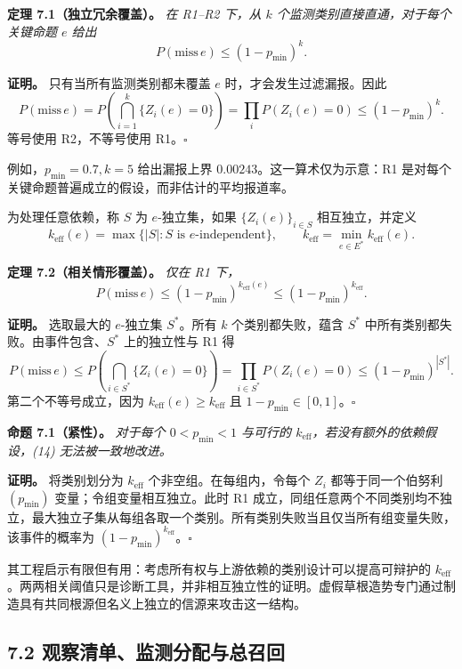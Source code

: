 \documentclass[
  chinese,
  11pt]{article}
\begin{document}
\textbf{定理 7.1（独立冗余覆盖）。} \emph{在 R1--R2 下，从 \(k\) 个监测类别直接直通，对于每个关键命题 \(e\) 给出} \[
P(\mathrm{miss}\,e)\leq(1-p_{\min})^k.
\tag{13}
\]

\textbf{证明。} 只有当所有监测类别都未覆盖 \(e\) 时，才会发生过滤漏报。因此 \[
P(\mathrm{miss}\,e)=P\!\left(\bigcap_{i=1}^k\{Z_i(e)=0\}\right)
=\prod_iP(Z_i(e)=0)\leq(1-p_{\min})^k.
\] 等号使用 R2，不等号使用 R1。\(\square\)

例如，\(p_{\min}=0.7,k=5\) 给出漏报上界 \(0.00243\)。这一算术仅为示意：R1 是对每个关键命题普遍成立的假设，而非估计的平均报道率。

为处理任意依赖，称 \(S\) 为 \(e\)-独立集，如果 \(\{Z_i(e)\}_{i\in S}\) 相互独立，并定义 \[
k_{\mathrm{eff}}(e)=\max\{|S|:S\text{ is }e\text{-independent}\},
\qquad k_{\mathrm{eff}}=\min_{e\in E^*}k_{\mathrm{eff}}(e).
\]

\textbf{定理 7.2（相关情形覆盖）。} \emph{仅在 R1 下，} \[
P(\mathrm{miss}\,e)\leq(1-p_{\min})^{k_{\mathrm{eff}}(e)}
\leq(1-p_{\min})^{k_{\mathrm{eff}}}.
\tag{14}
\]

\textbf{证明。} 选取最大的 \(e\)-独立集 \(S^*\)。所有 \(k\) 个类别都失败，蕴含 \(S^*\) 中所有类别都失败。由事件包含、\(S^*\) 上的独立性与 R1 得 \[
P(\mathrm{miss}\,e)\leq P\!\left(\bigcap_{i\in S^*}\{Z_i(e)=0\}\right)
=\prod_{i\in S^*}P(Z_i(e)=0)
\leq(1-p_{\min})^{|S^*|}.
\] 第二个不等号成立，因为 \(k_{\mathrm{eff}}(e)\geq k_{\mathrm{eff}}\) 且 \(1-p_{\min}\in[0,1]\)。\(\square\)

\textbf{命题 7.1（紧性）。} \emph{对于每个 \(0<p_{\min}<1\) 与可行的 \(k_{\mathrm{eff}}\)，若没有额外的依赖假设，(14) 无法被一致地改进。}

\textbf{证明。} 将类别划分为 \(k_{\mathrm{eff}}\) 个非空组。在每组内，令每个 \(Z_i\) 都等于同一个伯努利\((p_{\min})\) 变量；令组变量相互独立。此时 R1 成立，同组任意两个不同类别均不独立，最大独立子集从每组各取一个类别。所有类别失败当且仅当所有组变量失败，该事件的概率为 \((1-p_{\min})^{k_{\mathrm{eff}}}\)。\(\square\)

其工程启示有限但有用：考虑所有权与上游依赖的类别设计可以提高可辩护的 \(k_{\mathrm{eff}}\)。两两相关阈值只是诊断工具，并非相互独立性的证明。虚假草根造势专门通过制造具有共同根源但名义上独立的信源来攻击这一结构。

\subsection{7.2 观察清单、监测分配与总召回}\label{ux89c2ux5bdfux6e05ux5355ux76d1ux6d4bux5206ux914dux4e0eux603bux53ecux56de}
\end{document}

